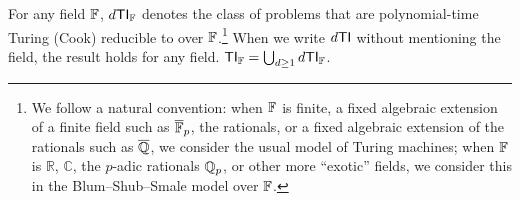\begin{definition}[{$d\cc{TI}, \cc{TI}$}]
For any field $\mathbb{F}$, $d\mathsf{TI}_{\mathbb{F}}$ denotes the class of problems that are 
polynomial-time Turing (Cook) reducible to \DeeTIlong over 
$\mathbb{F}$.\footnote{We follow a natural convention: when $\mathbb{F}$ is finite, a fixed 
algebraic extension of a finite field such as $\overline{\mathbb{F}}_p$, the rationals, or 
a fixed algebraic extension of the rationals such as $\overline{\mathbb{Q}}$, we consider 
the usual model of Turing machines; when $\mathbb{F}$ is $\mathbb{R}$, $\mathbb{C}$, the 
$p$-adic rationals $\mathbb{Q}_p$, or other more ``exotic'' fields, we consider this in 
the Blum--Shub--Smale model over $\mathbb{F}$.} When we write $d\mathsf{TI}$ without 
mentioning the field, the result holds for any field. 
$\mathsf{TI}_{\mathbb{F}} = \bigcup_{d \geq 1} d\mathsf{TI}_{\mathbb{F}}$. 
\end{definition}

